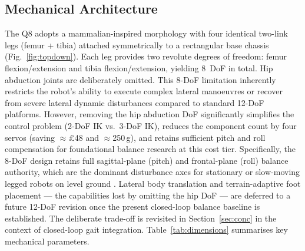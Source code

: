 \documentclass[journal]{IEEEtran}
\begin{document}
\subsection{Mechanical Architecture}
The Q8 adopts a mammalian-inspired morphology with four identical
two-link legs (femur + tibia) attached symmetrically to a
rectangular base chassis (Fig.~\ref{fig:topdown}).
Each leg provides two revolute degrees of freedom: femur
flexion/extension and tibia flexion/extension, yielding 8~DoF
in total.
Hip abduction joints are deliberately omitted.
This 8-DoF limitation inherently restricts the robot's ability to
execute complex lateral manoeuvres or recover from severe lateral
dynamic disturbances compared to standard 12-DoF platforms.
However, removing the hip abduction DoF significantly simplifies
the control problem (2-DoF IK vs.\ 3-DoF IK), reduces the component
count by four servos (saving $\approx$\pounds48 and $\approx$250\,g),
and retains sufficient pitch and roll
compensation for foundational balance research at this cost tier.
Specifically, the 8-DoF design retains full sagittal-plane (pitch)
and frontal-plane (roll) balance authority, which are the dominant
disturbance axes for stationary or slow-moving legged robots on
level ground \cite{vukobratovic2004zmp}.
Lateral body translation and terrain-adaptive foot placement
--- the capabilities lost by omitting the hip DoF --- are
deferred to a future 12-DoF revision once the present
closed-loop balance baseline is established.
The deliberate trade-off is revisited in Section~\ref{sec:conc}
in the context of closed-loop gait integration.
Table~\ref{tab:dimensions} summarises key mechanical parameters.
\end{document}
